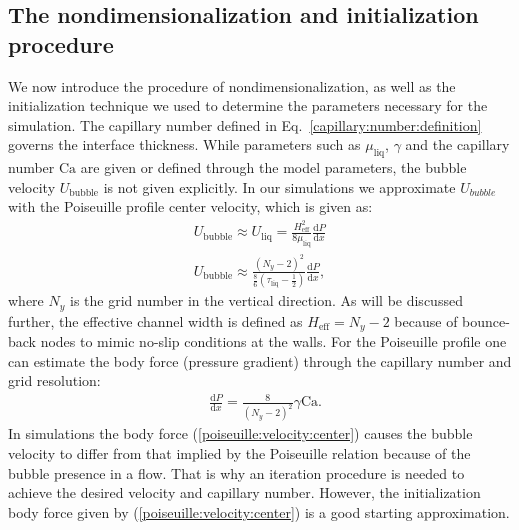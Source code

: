 \documentclass[preprint,12pt]{elsarticle}
\newcommand{\Ca}{\mathrm{Ca}}
\begin{document}
\subsection{The nondimensionalization and initialization procedure}
We now introduce the procedure of nondimensionalization, as well as
the initialization technique we used to determine the parameters necessary for
the simulation. The capillary number defined in Eq.~\ref{capillary:number:definition} governs the
interface thickness.
While parameters such as $\mu_{\mathrm{liq}}$, $\gamma$ and the capillary number $\Ca$ are given
or defined through the model parameters, the bubble velocity $U_{\mathrm{bubble}}$ is not given
explicitly.
In our simulations we approximate $U_{bubble}$ with the
Poiseuille profile center velocity, which is given as:
\begin{equation}
\begin{aligned}
U_{\mathrm{bubble}} \approx U_{\mathrm{liq}}=\frac{H_{\mathrm{eff}}^2}{8
\mu_{\mathrm{liq}}}\frac{\mathrm{d}P}{\mathrm{d}x}\\
U_{\mathrm{bubble}}\approx
\frac{{(N_y-2)}^2}{\frac{8}{6}(\tau_{\mathrm{liq}}-\frac{1}{2})}\frac{\mathrm{d}P}{\mathrm{d}
x } ,
\end{aligned}
\end{equation}
where $N_y$ is the grid number in the vertical direction. As will be discussed further, the
effective channel width is defined as $H_{\mathrm{eff}}=N_y-2$ because of bounce-back nodes to
mimic no-slip conditions at the walls.
For the Poiseuille profile one can estimate the body force (pressure gradient) through the
capillary number and grid resolution:
\begin{equation}
\label{poiseuille:velocity:center}
\begin{aligned}
&\frac{\mathrm{d}P}{\mathrm{d}x}=\frac{8}{{(N_y-2)}^2}\gamma \Ca.
\end{aligned}
\end{equation}
In simulations the body force (\ref{poiseuille:velocity:center}) causes the bubble
velocity to differ from that implied by the Poiseuille relation because of the bubble presence in a
flow. That is
why an iteration procedure is needed to achieve the 
desired velocity and 
capillary number. 
However, the initialization body force given by (\ref{poiseuille:velocity:center}) is a good
starting approximation. 
\end{document}
